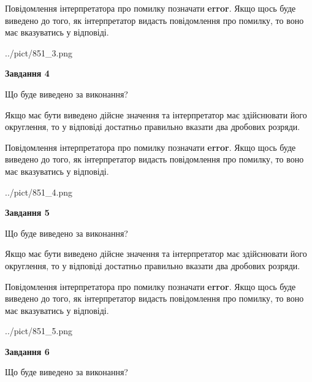 \documentclass[12pt, ukrainian]{article}
\begin{document}
{\begin {Large}
Повідомлення інтерпретатора про помилку позначати \textbf{error}.
Якщо щось буде виведено до того, як інтерпретатор видасть повідомлення про помилку, 
то воно має вказуватись у відповіді. \par

\begin{center}
	{../pict/851_3.png}
\end{center}
\newpage

{\begin {center}\textbf{Завдання 4}\end {center}}\par
Що буде виведено за виконання? \par

Якщо має бути виведено дійсне значення та інтерпретатор має здійснювати його округлення, 
то у відповіді достатньо правильно вказати два дробових розряди.

Повідомлення інтерпретатора про помилку позначати \textbf{error}.
Якщо щось буде виведено до того, як інтерпретатор видасть повідомлення про помилку, 
то воно має вказуватись у відповіді. \par

\begin{center}
	{../pict/851_4.png}
\end{center}
\newpage

{\begin {center}\textbf{Завдання 5}\end {center}}\par
Що буде виведено за виконання? \par

Якщо має бути виведено дійсне значення та інтерпретатор має здійснювати його округлення, 
то у відповіді достатньо правильно вказати два дробових розряди.

Повідомлення інтерпретатора про помилку позначати \textbf{error}.
Якщо щось буде виведено до того, як інтерпретатор видасть повідомлення про помилку, 
то воно має вказуватись у відповіді. \par

\begin{center}
	{../pict/851_5.png}
\end{center}
\newpage

{\begin {center}\textbf{Завдання 6}\end {center}}\par
Що буде виведено за виконання? \par


\end{Large}}
\end{document}
